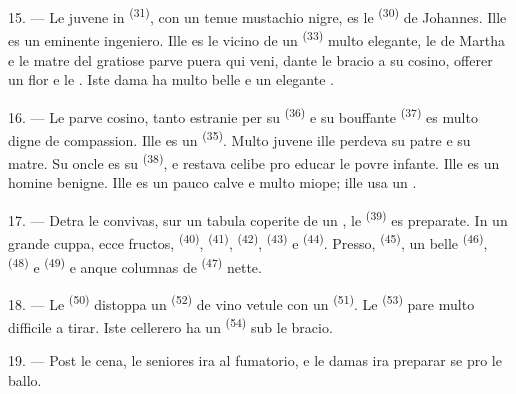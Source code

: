 15. --- Le juvene in  \textsuperscript{(31)}, con un tenue
mustachio nigre, es le  \textsuperscript{(30)} de Johannes. Ille
es un eminente ingeniero. Ille es le vicino de un 
\textsuperscript{(33)} multo elegante, le  de Martha e le
matre del gratiose parve puera qui veni, dante le bracio a su cosino, offerer un
flor e  le . Iste dama ha multo belle
 e un elegante .

16. --- Le parve cosino, tanto estranie per su 
\textsuperscript{(36)} e su  bouffante \textsuperscript{(37)}
es multo digne de compassion. Ille es un 
\textsuperscript{(35)}. Multo juvene ille perdeva su patre e su matre. Su oncle
es su  \textsuperscript{(38)}, e restava celibe pro educar le
povre infante. Ille es un homine benigne. Ille es un pauco calve e multo miope;
ille usa un .

\VUsaut{2.4mm}
\VUsaut{3.0mm}

17. --- Detra le convivas, sur un tabula coperite de un ,
le  \textsuperscript{(39)} es preparate. In un grande cuppa,
ecce fructos,  \textsuperscript{(40)}, 
\textsuperscript{(41)},  \textsuperscript{(42)},
 \textsuperscript{(43)} e 
\textsuperscript{(44)}. Presso,  \textsuperscript{(45)}, un belle
 \textsuperscript{(46)}, 
\textsuperscript{(48)} e  \textsuperscript{(49)} e anque
columnas de  \textsuperscript{(47)} nette.

18. --- Le  \textsuperscript{(50)} distoppa un
 \textsuperscript{(52)} de vino vetule con un
 \textsuperscript{(51)}. Le 
\textsuperscript{(53)} pare multo difficile a tirar. Iste cellerero ha un
 \textsuperscript{(54)} sub le bracio.

19. --- Post le cena, le seniores ira al fumatorio, e le damas ira preparar se
pro le ballo.

\VUsaut{5.0mm}
\VUsaut{1.6mm}
\VUsaut{2.6mm}

